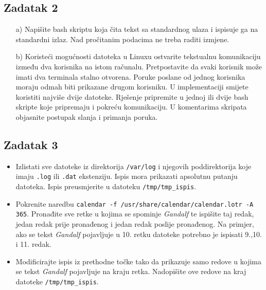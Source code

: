 \documentclass[12pt,a4paper]{article}
\newcommand{\shell}[1]{\texttt{#1}}
\begin{document}
	\subsection*{Zadatak 2}
	\begin{itemize}
		\item[a)] Napišite bash skriptu koja čita tekst sa standardnog ulaza i ispisuje ga na standardni izlaz. Nad pročitanim podacima ne treba raditi izmjene.
		\item[b)] Koristeći mogućnosti datoteka u Linuxu ostvarite tekstualnu komunikaciju između dva korisnika na istom računalu. Pretpostavite da svaki korisnik može imati dva terminala stalno otvorena. Poruke poslane od jednog korisnika moraju odmah biti prikazane drugom korisniku. U implementaciji smijete koristiti najviše dvije datoteke. Rješenje pripremite u jednoj ili dvije bash skripte koje pripremaju i pokreću komunikaciju. U komentarima skripata objasnite postupak slanja i primanja poruka.
	\end{itemize}
	\subsection*{Zadatak 3}
	\begin{itemize}
		\item Izlistati sve datoteke iz direktorija \shell{/var/log} i njegovih poddirektorija koje imaju \shell{.log} ili \shell{.dat} ekstenziju. Ispis mora prikazati apsolutnu putanju datoteka. Ispis preusmjerite u datoteku \shell{/tmp/tmp\_ispis}.
		\item Pokrenite naredbu \shell{calendar -f /usr/share/calendar/calendar.lotr -A 365}. Pronađite sve retke u kojima se spominje \textit{Gandalf} te ispišite taj redak, jedan redak prije pronađenog i jedan redak poslije pronađenog. Na primjer, ako se tekst \textit{Gandalf} pojavljuje u 10. retku datoteke potrebno je ispisati 9.,10. i 11. redak.
		\item Modificirajte ispis iz prethodne točke tako da prikazuje samo redove u kojima se tekst \textit{Gandalf} pojavljuje na kraju retka. Nadopišite ove redove na kraj datoteke \shell{/tmp/tmp\_ispis}.
	\end{itemize}
\end{document}
